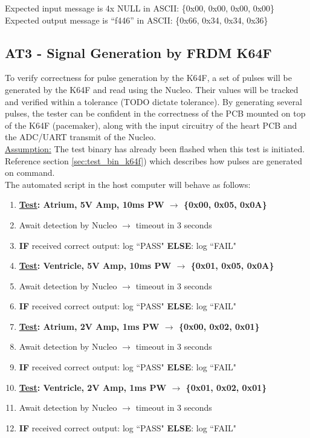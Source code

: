 \documentclass[]{article}
\begin{document}
Expected input message is 4x NULL in ASCII: \{0x00, 0x00, 0x00, 0x00\}\\
Expected output message is ``f446'' in ASCII: \{0x66, 0x34, 0x34, 0x36\}\\

\subsection{AT3 - Signal Generation by FRDM K64F}

To verify correctness for pulse generation by the K64F, a set of pulses will be generated by the K64F and read using the Nucleo. Their values will be tracked and verified within a tolerance (TODO dictate tolerance). By generating several pulses, the tester can be confident in the correctness of the PCB mounted on top of the K64F (pacemaker), along with the input circuitry of the heart PCB and the ADC/UART transmit of the Nucleo.\\

\underline{Assumption:} The test binary has already been flashed when this test is initiated.\\

Reference section \ref{sec:test_bin_k64f}) which describes how pulses are generated on command.\\

The automated script in the host computer will behave as follows:
\begin{enumerate}
	\item \textbf{\underline{Test}: Atrium, 5V Amp, 10ms PW $\rightarrow$ \{0x00, 0x05, 0x0A\}}
	\item Await detection by Nucleo $\rightarrow$ timeout in 3 seconds
	\item \textbf{IF} received correct output: log ``PASS" \textbf{ELSE}: log ``FAIL"
	
	\item \textbf{\underline{Test}: Ventricle, 5V Amp, 10ms PW $\rightarrow$ \{0x01, 0x05, 0x0A\}}
	\item Await detection by Nucleo $\rightarrow$ timeout in 3 seconds
	\item \textbf{IF} received correct output: log ``PASS" \textbf{ELSE}: log ``FAIL"
	
	\item \textbf{\underline{Test}: Atrium, 2V Amp, 1ms PW $\rightarrow$ \{0x00, 0x02, 0x01\}}
	\item Await detection by Nucleo $\rightarrow$ timeout in 3 seconds
	\item \textbf{IF} received correct output: log ``PASS" \textbf{ELSE}: log ``FAIL"
	
	\item \textbf{\underline{Test}: Ventricle, 2V Amp, 1ms PW $\rightarrow$ \{0x01, 0x02, 0x01\}}
	\item Await detection by Nucleo $\rightarrow$ timeout in 3 seconds
	\item \textbf{IF} received correct output: log ``PASS" \textbf{ELSE}: log ``FAIL"
\end{enumerate}
\end{document}
